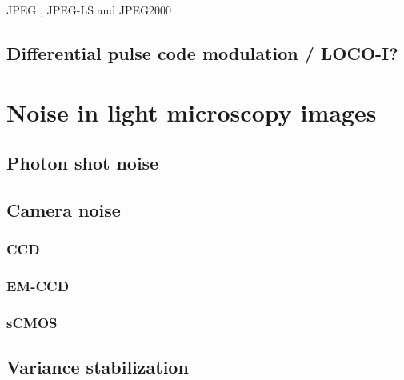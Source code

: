       JPEG \cite{pennebaker_jpeg:_1992}, JPEG-LS \cite{weinberger_loco-i_2000} and JPEG2000 \cite{adams_jpeg-2000_2001}
      


  \subsection{Differential pulse code modulation / LOCO-I?}

  


\section{Noise in light microscopy images}
  \subsection{Photon shot noise}
  \subsection{Camera noise}
    \subsubsection{CCD}
    \subsubsection{EM-CCD}
    \subsubsection{sCMOS}
  \subsection{Variance stabilization}

